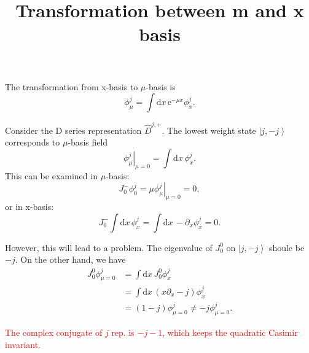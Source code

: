 \documentclass[10pt,a4paper]{article}
\numberwithin{equation}{section}
\newcommand{\ket}[1]{\left| #1 \right\rangle}
\begin{document}
\title{Transformation between m and x basis}
\maketitle

The transformation from x-basis to $\mu$-basis is 
\begin{equation}
    \phi^{j}_{\mu} = \int \mathrm{d} x \, \mathrm{e}^{- \mu x} \phi^{j}_{x}.
\end{equation}

Consider the D series representation $\hat{D}^{j,+}$. The lowest weight state $\ket{j, -j}$ corresponds to $\mu$-basis field 
\begin{equation}
    \left.\phi^{j}_{\mu}\right|_{\mu = 0} = \int \mathrm{d} x \, \phi^{j}_{x}.
\end{equation}
This can be examined in $\mu$-basis: 
\begin{equation}
    J^{-}_{0} \phi^{j}_{ 0} = \left.\mu \phi^{j}_{\mu}\right|_{\mu = 0} = 0,
\end{equation}
or in x-basis:
\begin{equation}
    J^{-}_{0} \int \mathrm{d} x \, \phi^{j}_{x} = \int \mathrm{d} x \, - \partial_{x} \phi^{j}_{x} = 0.
\end{equation}

However, this will lead to a problem. The eigenvalue of $J^{0}_{0}$ on $\ket{j, -j}$ shoule be $-j$. On the other hand, we have 
\begin{align}
    J^{0}_{0} \phi^{j}_{\mu = 0} & = \int \mathrm{d} x \, J^{0}_{0} \phi^{j}_{x} \\
                                 & = \int \mathrm{d} x \, (x\partial_{x} - j) \phi^{j}_{x}\\
                                 & = (1-j) \phi^{j}_{\mu = 0} \neq -j \phi^{j}_{\mu = 0}.
\end{align}

\textcolor{red}{The complex conjugate of $j$ rep. is $-j-1$, which keeps the quadratic Casimir invariant.}
\end{document}
